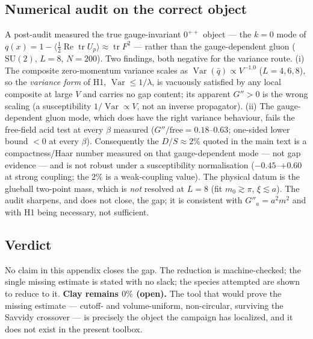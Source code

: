 \subsection{Numerical audit on the correct object}
\LE{} A post-audit measured the true gauge-invariant $0^{++}$ object --- the
$k=0$ mode of $q(x)=1-\langle\tfrac12\operatorname{Re}\operatorname{tr}U_p\rangle
\approx\operatorname{tr}F^2$ --- rather than the gauge-dependent gluon
($\mathrm{SU}(2)$, $L=8$, $N=200$). Two findings, both negative for the variance
route. (i) The composite zero-momentum variance scales as
$\operatorname{Var}(\bar q)\propto V^{-1.0}$ ($L=4,6,8$), so the \emph{variance
form} of H1, $\operatorname{Var}\le1/\lambda$, is vacuously satisfied by any local
composite at large $V$ and carries no gap content; its apparent $G''>0$ is the
wrong scaling (a susceptibility $1/\operatorname{Var}\propto V$, not an inverse
propagator). (ii) The gauge-dependent gluon mode, which does have the right
variance behaviour, fails the free-field acid test at every $\beta$ measured
($G''/\text{free}=0.18$--$0.63$; one-sided lower bound $<0$ at every $\beta$).
Consequently the $D/S\approx2\%$ quoted in the main text is a compactness/Haar
number measured on that gauge-dependent mode --- not gap evidence --- and is not
robust under a susceptibility normalisation ($-0.45$--$+0.60$ at strong coupling;
the $2\%$ is a weak-coupling value). The physical datum is the glueball two-point
mass, which is \emph{not} resolved at $L=8$ (fit $m_0\gtrsim\pi$,
$\xi\lesssim a$). The audit sharpens, and does not close, the gap; it is
consistent with $G''_a=a^2m^2$ and with H1 being necessary, not sufficient.

\subsection{Verdict}
No claim in this appendix closes the gap. The reduction is machine-checked; the
single missing estimate is stated with no slack; the species attempted are shown
to reduce to it. \textbf{Clay remains $0\%$ (open).} The tool that would prove the
missing estimate --- cutoff- and volume-uniform, non-circular, surviving the
Savvidy crossover --- is precisely the object the campaign has localized, and it
does not exist in the present toolbox.
